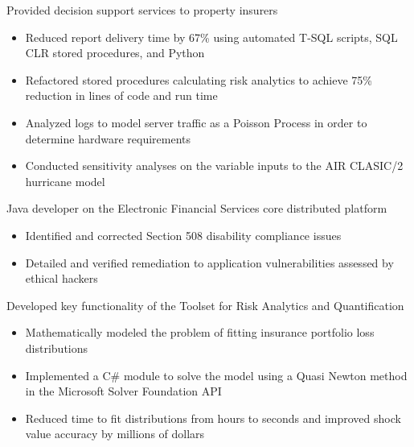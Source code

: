 \documentclass[10pt,a4paper,sans]{moderncv}        %
\begin{document}
{Provided decision support services to property insurers
\begin{itemize}
	\item Reduced report delivery time by 67\% using automated T-SQL scripts, SQL CLR stored procedures, and Python
	\item Refactored stored procedures calculating risk analytics to achieve 75\% reduction in lines of code and run time
	\item Analyzed logs to model server traffic as a Poisson Process in order to determine hardware requirements
	\item Conducted sensitivity analyses on the variable inputs to the AIR CLASIC/2 hurricane model
\end{itemize}}

{Java developer on the Electronic Financial Services core distributed platform
\begin{itemize}
	\item Identified and corrected Section 508 disability compliance issues
	\item Detailed and verified remediation to application vulnerabilities assessed by ethical hackers
\end{itemize}}


{Developed key functionality of the Toolset for Risk Analytics and Quantification
\begin{itemize}
	\item Mathematically modeled the problem of fitting insurance portfolio loss distributions
	\item Implemented a C\# module to solve the model using a Quasi Newton method in the Microsoft Solver Foundation API
	\item Reduced time to fit distributions from hours to seconds and improved shock value accuracy by millions of dollars
\end{itemize}}
\end{document}
